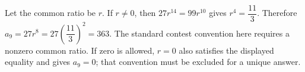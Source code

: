 Let the common ratio be $r$. If $r\ne 0$, then $27r^{14}=99r^{10}$ gives $r^4=\dfrac{11}{3}$. Therefore $a_9=27r^8=27(\dfrac{11}{3})^2=\boxed{363}$. The standard contest convention here requires a nonzero common ratio. If zero is allowed, $r=0$ also satisfies the displayed equality and gives $a_9=0$; that convention must be excluded for a unique answer.
